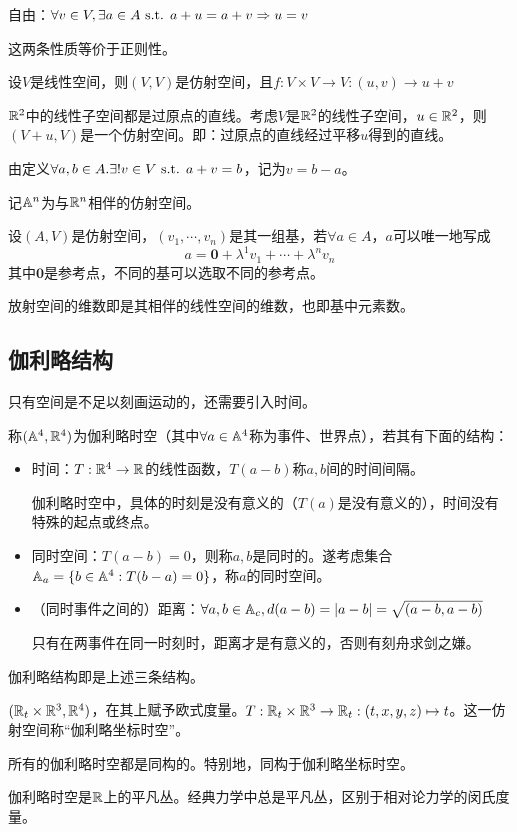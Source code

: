 \documentclass{ctexbook}
\begin{document}
  自由：$\forall v\in V,\exists a\in A\text{ s.t. } a+u=a+v\Rightarrow u=v$

  这两条性质等价于正则性。

  \begin{Eg}
    设$V$是线性空间，则$(V,V)$是仿射空间，且$f:V\times V\to V:(u,v)\to u+v$
  \end{Eg}

  \begin{Eg}
    $\mathbb{R}^{2}$中的线性子空间都是过原点的直线。考虑$V$是$\mathbb{R}^{2}$的线性子空间，$u\in \mathbb{R}^{2}$，则$(V+u,V)$是一个仿射空间。即：过原点的直线经过平移$u$得到的直线。
  \end{Eg}

由定义$\forall a,b\in A.\exists !v\in V\text{ s.t. } a+v=b$，记为$v=b-a$。

记$\mathbb{A}^{n}$为与$\mathbb{R}^{n}$相伴的仿射空间。

\begin{Def}[仿设标架]
  设$(A,V)$是仿射空间，$(v_{1},\cdots,v_{n})$是其一组基，若$\forall a\in A$，$a$可以唯一地写成
  \[a=\bm 0+\lambda^{1}v_{1}+\cdots+\lambda^{n}v_{n}\]
  其中$\bm 0$是参考点，不同的基可以选取不同的参考点。
\end{Def}

放射空间的维数即是其相伴的线性空间的维数，也即基中元素数。

\subsection{伽利略结构}
只有空间是不足以刻画运动的，还需要引入时间。
\begin{Def}[伽利略时空]
  称$(\mathbb{A}^{4},\mathbb{R}^{4})$为伽利略时空（其中$\forall a\in\mathbb{A}^{4}$称为事件、世界点），若其有下面的结构：
  \begin{itemize}
  \item 时间：$T:\mathbb{R}^{4}\to\mathbb{R}$的线性函数，$T(a-b)$称$a,b$间的时间间隔。

    伽利略时空中，具体的时刻是没有意义的（$T(a)$是没有意义的），时间没有特殊的起点或终点。
  \item 同时空间：$T(a-b)=0$，则称$a,b$是同时的。遂考虑集合$\mathbb{A}_{a}=\{b\in\mathbb{A}^{4}:T(b-a)=0\}$，称$a$的同时空间。
  \item （同时事件之间的）距离：$\forall a,b\in\mathbb{A}_{c},d(a-b)=|a-b|=\sqrt{(a-b,a-b)}$

    只有在两事件在同一时刻时，距离才是有意义的，否则有刻舟求剑之嫌。
  \end{itemize}
  伽利略结构即是上述三条结构。
\end{Def}

\begin{Eg}
  $(\mathbb{R}_{t}\times \mathbb{R}^{3},\mathbb{R}^{4})$，在其上赋予欧式度量。$T:\mathbb{R}_{t}\times \mathbb{R}^{3}\to \mathbb{R}_{t}:(t,x,y,z)\mapsto t$。这一仿射空间称“伽利略坐标时空”。
\end{Eg}
\begin{Prop}
  所有的伽利略时空都是同构的。特别地，同构于伽利略坐标时空。
\end{Prop}
伽利略时空是$\mathbb{R}$上的平凡丛。经典力学中总是平凡丛，区别于相对论力学的闵氏度量。
\end{document}
